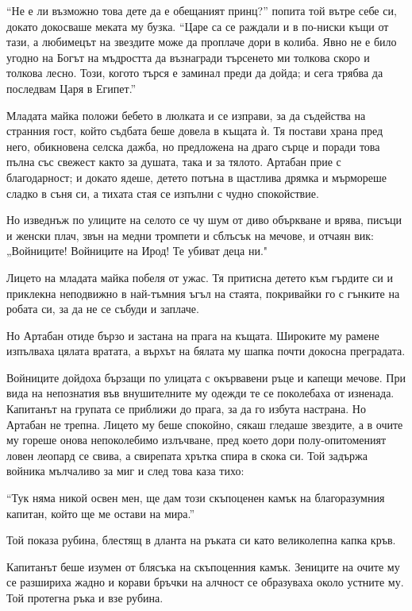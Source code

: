 \documentclass[oneside,10pt]{memoir}
\begin{document}
``Не е ли възможно това дете да е обещаният принц?'' попита той вътре себе си,
докато докосваше меката му бузка. ``Царе са се раждали и в по-ниски къщи от
тази, а любимецът на звездите може да проплаче дори в колиба. Явно не е било
угодно на Богът на мъдростта да възнагради търсенето ми толкова скоро и толкова
лесно. Този, когото търся е заминал преди да дойда; и сега трябва да последвам
Царя в Египет.''

Младата майка положи бебето в люлката и се изправи, за да съдейства на странния
гост, който съдбата беше довела в къщата ѝ. Тя постави храна пред него,
обикновена селска дажба, но предложена на драго сърце и поради това пълна със
свежест както за душата, така и за тялото. Артабан прие с благодарност; и докато
ядеше, детето потъна в щастлива дрямка и мърмореше сладко в съня си, а тихата
стая се изпълни с чудно спокойствие.

Но изведнъж по улиците на селото се чу шум от диво объркване и врява, писъци и
женски плач, звън на медни тромпети и сблъсък на мечове, и отчаян вик:
„Войниците! Войниците на Ирод! Те убиват деца ни."

Лицето на младата майка побеля от ужас. Тя притисна детето към гърдите си и
приклекна неподвижно в най-тъмния ъгъл на стаята, покривайки го с гънките на
робата си, за да не се събуди и заплаче.

Но Артабан отиде бързо и застана на прага на къщата. Широките му рамене
изпълваха цялата вратата, а върхът на бялата му шапка почти докосна преградата.

Войниците дойдоха бързащи по улицата с окървавени ръце и капещи мечове. При вида
на непознатия във внушителните му одежди те се поколебаха от изненада. Капитанът
на групата се приближи до прага, за да го избута настрана. Но Артабан не трепна.
Лицето му беше спокойно, сякаш гледаше звездите, а в очите му гореше онова
непоколебимо излъчване, пред което дори полу-опитоменият ловен леопард се свива,
а свирепата хрътка спира в скока си. Той задържа войника мълчаливо за миг и след
това каза тихо:

``Тук няма никой освен мен, ще дам този скъпоценен камък на благоразумния
капитан, който ще ме остави на мира.''

Той показа рубина, блестящ в дланта на ръката си като великолепна капка кръв.

Капитанът беше изумен от блясъка на скъпоценния камък. Зениците на очите му се
разшириха жадно и корави бръчки на алчност се образуваха около устните му. Той
протегна ръка и взе рубина.
\end{document}
